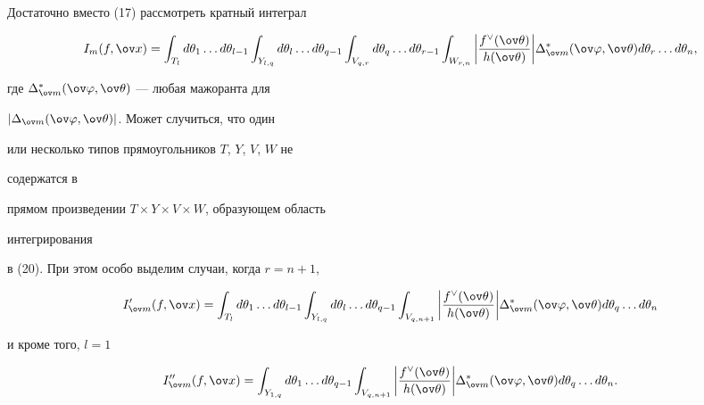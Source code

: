 Достаточно вместо (17) рассмотреть кратный интеграл 


\begin{equation} 


I_m(f,\ov x)=\int_{T_l}d\theta_1\dotsc d\theta_{l-1} 


\int_{Y_{l,q}}d\theta_l\dotsc d\theta_{q-1} 


\int_{V_{q,r}}d\theta_q\dotsc d\theta_{r-1} 


\int_{W_{r,n}}\bigg| 


\frac{f^\vee(\ov\theta)}{h(\ov\theta)}\bigg| 


\Delta^*_{\ov m}(\ov\varphi,\ov\theta) 


d\theta_r\dotsc d\theta_n, 


\end{equation} 


где $\Delta^*_{\ov m}(\ov\varphi,\ov\theta)$ --- любая мажоранта для 


$|\Delta_{\ov m}(\ov\varphi,\ov\theta)|$. Может случиться, что один 


или несколько типов прямоугольников $T$, $Y$, $V$, $W$ не 


содержатся в 


прямом произведении $T\times Y\times V\times W$, образующем область 


интегрирования 


в (20). При этом особо выделим случаи, когда $r=n+1$, 


\begin{equation} 


I'_{\ov m}(f,\ov x)=\int_{T_l} 


d\theta_1\dotsc d\theta_{l-1}\int_{Y_{l,q}} 


d\theta_l\dotsc d\theta_{q-1}\int_{V_{q,n+1}} 


\bigg|\frac{f^\vee(\ov\theta)}{h(\ov\theta)}\bigg| 


\Delta^*_{\ov m}(\ov\varphi,\ov\theta) 


d\theta_q\dotsc d\theta_n 


\end{equation} 


и кроме того, $l=1$ 


\begin{equation} 


I''_{\ov m}(f,\ov x)=\int_{Y_{1,q}} 


d\theta_1\dotsc d\theta_{q-1}\int_{V_{q,n+1}} 


\bigg|\frac{f^\vee(\ov\theta)}{h(\ov\theta)}\bigg| 


\Delta^*_{\ov m}(\ov\varphi,\ov\theta) 


d\theta_q\dotsc d\theta_n. 


\end{equation} 


